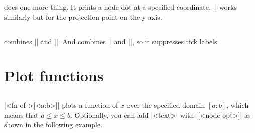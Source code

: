 \icmd{\tzprojx*} does one more thing. It prints a node dot at a specified coordinate. |\tzprojy*| works similarly but for the projection point on the y-axis.


\begin{tzcode}{.3}
\end{tzcode}


\subsection{\protect\cmd{\tzproj(*)}}
\label{ssi:tzproj}

\icmd{\tzproj} combines |\tzprojx| and |\tzprojy|. 
And \icmd{\tzproj*} combines |\tzprojx*| and |\tzprojy*|, so it suppresses tick labels.


\begin{tzcode}{.3}
\end{tzcode}


\section{Plot functions}
\label{si:plotfunctions}

\subsection{\protect\cmd{\tzfn}}
\label{ssi:tzfn}

\icmd{\tzfn}|{<fn of \x>}[<a:b>]| plots a function of $x$ over the specified domain $[a:b]$, which means that $a\leq x \leq b$.
Optionally, you can add |{<text>}| with |[<node opt>]| as shown in the following example.

\begin{tzcode}{.3}
\end{tzcode}

